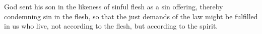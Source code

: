
\lettrine{G}{}od sent his son in the likeness of sinful flesh as a sin offering, thereby condemning sin in the flesh, so that the just demands of the law might be fulfilled in us who live, not according to the flesh, but according to the spirit.